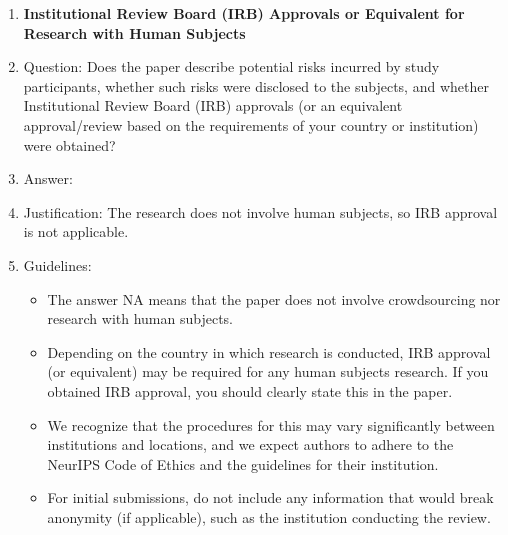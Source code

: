 \documentclass{article}
\begin{document}
\begin{enumerate}
\item {\bf Institutional Review Board (IRB) Approvals or Equivalent for Research with Human Subjects}
    \item[] Question: Does the paper describe potential risks incurred by study participants, whether such risks were disclosed to the subjects, and whether Institutional Review Board (IRB) approvals (or an equivalent approval/review based on the requirements of your country or institution) were obtained?
    \item[] Answer: \answerNA{}
    \item[] Justification: The research does not involve human subjects, so IRB approval is not applicable.
    \item[] Guidelines:
    \begin{itemize}
        \item The answer NA means that the paper does not involve crowdsourcing nor research with human subjects.
        \item Depending on the country in which research is conducted, IRB approval (or equivalent) may be required for any human subjects research. If you obtained IRB approval, you should clearly state this in the paper. 
        \item We recognize that the procedures for this may vary significantly between institutions and locations, and we expect authors to adhere to the NeurIPS Code of Ethics and the guidelines for their institution. 
        \item For initial submissions, do not include any information that would break anonymity (if applicable), such as the institution conducting the review.
    \end{itemize}

\end{enumerate}
\end{document}

